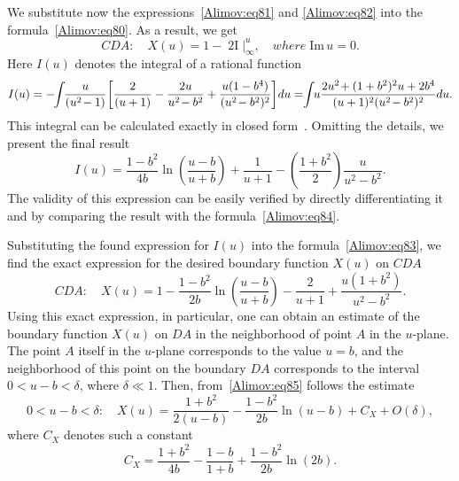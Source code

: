 \documentclass[
11pt,%
tightenlines,%
twoside,%
onecolumn,%
nofloats,%
nobibnotes,%
nofootinbib,%
superscriptaddress,%
noshowpacs,%
centertags]%
{revtex4-2}
\begin{document}
We substitute now the expressions~\eqref{Alimov:eq81} and \eqref{Alimov:eq82} into the
formula~\eqref{Alimov:eq80}. As a result, we get
\begin{equation}
\label{Alimov:eq83} CDA: \quad X(u) = 1 - \left. {\mathop {2I(u)}\limits} \right|_\infty ^u ,\quad
where \; \mbox{Im}\,u = 0.
\end{equation}
Here $I(u)$ denotes the integral of a rational function
\begin{equation}
\label{Alimov:eq84} I(u) = - \hspace{-1mm}\int \hspace{-1mm} {\frac{u}{(u^2\hspace{-0.5mm} -
1)}\hspace{-0.5mm}\left[ {\frac{2}{(u + 1)} - \frac{2u}{u^2\hspace{-0.5mm} - b^2} + \frac{u(1 -
b^4)}{(u^2\hspace{-0.5mm} - b^2)^2}}\right]\hspace{-0.5mm}du} = \hspace{-1mm}\int\hspace{-1mm}
{u\frac{2u^2\hspace{-0.5mm} + (1 + b^2)^2u + 2b^4}{(u + 1)^2(u^2\hspace{-0.5mm} - b^2)^2}du}.
\end{equation}
This integral can be calculated exactly in closed form~\cite{Alimov:bib22}. Omitting the details,
we present the final result
\[
 I(u) = \frac{1 - b^2}{4b}\ln \left( {\frac{u - b}{u + b}} \right) + \frac{1}{u + 1} - \left(
\frac{1 + b^2}{2} \right)\frac{u}{u^2 - b^2}.
\]
The validity of this expression can be easily verified by directly differentiating it and by
comparing the result with the formula~\eqref{Alimov:eq84}.

Substituting the found expression for $I(u)$ into the formula~\eqref{Alimov:eq83}, we find the
exact expression for the desired boundary function $X(u)$ on $CDA$
\begin{equation}
\label{Alimov:eq85} CDA: \quad X(u) = 1 - \frac{1 - b^2}{2b}\ln \left( {\frac{u - b}{u + b}}
\right) - \frac{2}{u + 1} + \frac{u(1 + b^2)}{u^2 - b^2}.
\end{equation}
Using this exact expression, in particular, one can obtain an estimate of the boundary function
$X(u)$ on $DA$ in the neighborhood of point $A$ in the $u$-plane. The point $A$ itself in the
$u$-plane corresponds to the value $u = b$, and the neighborhood of this point on the boundary $DA$
corresponds to the interval $0 < u - b < \delta$, where $\delta \ll 1$. Then,
from~\eqref{Alimov:eq85} follows the estimate
\begin{equation}
\label{Alimov:eq86} 0 < u - b < \delta : \quad X(u) = \frac{1 + b^2}{2(u - b)} - \frac{1 -
b^2}{2b}\ln (u - b) + C_X + O(\delta),
\end{equation}
where $C_X $ denotes such a constant
\begin{equation}
\label{Alimov:eq87} C_X = \frac{1 + b^2}{4b} - \frac{1 - b}{1 + b} + \frac{1 - b^2}{2b}\ln (2b).
\end{equation}
\end{document}
